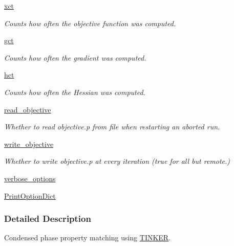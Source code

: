 \begin{DoxyCompactItemize}
\hyperlink{classforcebalance_1_1target_1_1Target_aad2e385cfbf7b4a68f1c2cb41133fe82}{xct}
\begin{DoxyCompactList}\small\item\em Counts how often the objective function was computed. \end{DoxyCompactList}\item 
\hyperlink{classforcebalance_1_1target_1_1Target_aa625ac88c6744eb14ef281d9496d0dbb}{gct}
\begin{DoxyCompactList}\small\item\em Counts how often the gradient was computed. \end{DoxyCompactList}\item 
\hyperlink{classforcebalance_1_1target_1_1Target_a5b5a42f78052b47f29ed4b940c6111a1}{hct}
\begin{DoxyCompactList}\small\item\em Counts how often the Hessian was computed. \end{DoxyCompactList}\item 
\hyperlink{classforcebalance_1_1target_1_1Target_a22bdc4bbce2020ae44b44ad3e444fda6}{read\-\_\-objective}
\begin{DoxyCompactList}\small\item\em Whether to read objective.\-p from file when restarting an aborted run. \end{DoxyCompactList}\item 
\hyperlink{classforcebalance_1_1target_1_1Target_a7a95624dfe03f0cee0e5f1ae09db306a}{write\-\_\-objective}
\begin{DoxyCompactList}\small\item\em Whether to write objective.\-p at every iteration (true for all but remote.) \end{DoxyCompactList}\item 
\hyperlink{classforcebalance_1_1BaseClass_afd68efa29ccd2f320f4cf82198214aac}{verbose\-\_\-options}
\item 
\hyperlink{classforcebalance_1_1BaseClass_afc6659278497d7245bc492ecf405ccae}{Print\-Option\-Dict}
\end{DoxyCompactItemize}


\subsubsection{Detailed Description}
Condensed phase property matching using \hyperlink{classforcebalance_1_1tinkerio_1_1TINKER}{T\-I\-N\-K\-E\-R}. 



